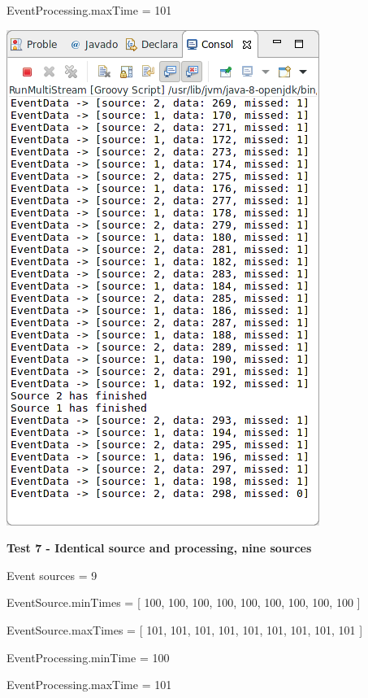 EventProcessing.maxTime = 101

\includegraphics[width=\textwidth/2]{img/screenshots/9-2-6.png}

\textbf{Test 7 - Identical source and processing, nine sources}

Event sources = 9

EventSource.minTimes = [ 100, 100, 100, 100, 100, 100, 100, 100, 100 ]

EventSource.maxTimes = [ 101, 101, 101, 101, 101, 101, 101, 101, 101 ]

EventProcessing.minTime = 100

EventProcessing.maxTime = 101

